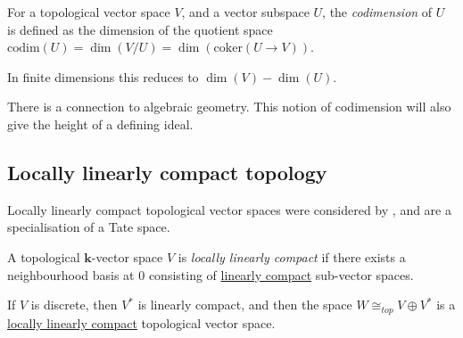         
        
        
        \begin{defn}[Codimension]
        For a topological vector space \(V\), and a vector subspace \(U\), the \emph{codimension} of \(U\) is defined as the dimension of the quotient space \( \mathrm{codim}(U) = \dim(V/U) = \dim( \mathrm{coker}(U \rightarrow V))\).
        \end{defn}
        In finite dimensions this reduces to \( \dim(V)-\dim(U)\). 
        \begin{rem}
        There is a connection to algebraic geometry. This notion of codimension will also give the height of a defining ideal.
        \end{rem}
        
        
        \subsection{Locally linearly compact topology}
        
        \label{sec:loclincomp}
        
        Locally linearly compact topological vector spaces were considered by \cite{drinfeld_tate}, and are a specialisation of a Tate space.
        
        \begin{defn} \label{defn:llc} A topological \( \mathbf{k}\)-vector space \(V\) is \emph{locally linearly compact} if there exists a neighbourhood basis at \(0\) consisting of \hyperref[defn:lctop]{linearly compact} sub-vector spaces.
        \end{defn}
        
        
               
        \begin{thm}
        If \(V\) is discrete, then \(V^*\) is linearly compact, and then the space
        \(W \cong_{top} V \oplus V^*\) is a \hyperref[defn:llc]{locally linearly compact} topological vector space.
        \end{thm}
        
